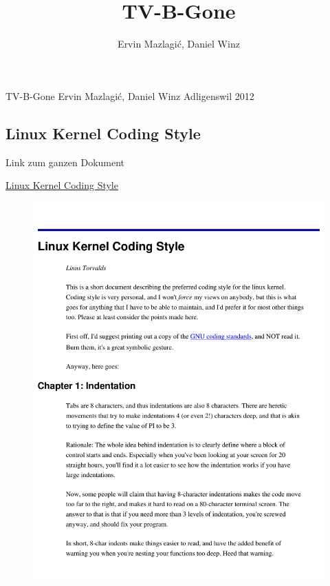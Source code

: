 \documentclass[a4paper,
               10pt,
               fleqn]{article}
\author{Ervin Mazlagi\'c, Daniel Winz}
\title{TV-B-Gone}
\begin{document}
         {TV-B-Gone}
         {Ervin Mazlagi\'c, Daniel Winz}
         {Adligenswil}
         {2012}

\tableofcontents
\newpage








\begin{appendix}
    \clearpage
    \newpage

    \section{Linux Kernel Coding Style}
    Link zum ganzen Dokument 

    \href{https://computing.llnl.gov/linux/slurm/coding_style.pdf}{
        Linux Kernel Coding Style}
    \begin{figure}[h!]
    \includegraphics[page=1, width=1\textwidth]{kernelstyle.pdf}
    \end{figure}
    \newpage


\end{appendix}
\end{document}
